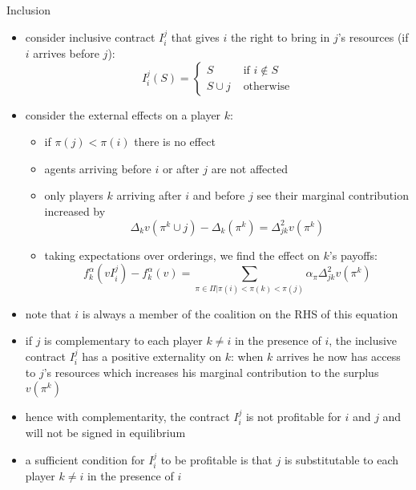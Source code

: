\documentclass[11pt,english]{beamer}
\begin{document}
\begin{frame}[allowframebreaks]{Inclusion}
  \begin{itemize}
  \item consider inclusive contract $I_i^j$ that gives $i$ the right
    to bring in $j$'s resources (if $i$ arrives before $j$):
    \begin{equation*}
      I_i^j(S) =
      \begin{cases}
        S &\text{ if } i \notin S \\
        S \cup j &\text{ otherwise}
      \end{cases}
    \end{equation*}
  \item consider the external effects on a player $k$:
    \begin{itemize}
    \item if $\pi(j)<\pi(i)$ there is no effect
    \item agents arriving before $i$ or after $j$ are not affected
    \item only players $k$ arriving after $i$ and before $j$ see their
      marginal contribution increased by
      \begin{equation*}
        \Delta_k v(\pi^k \cup j)-\Delta_k(\pi^k) = \Delta^2_{jk} v(\pi^k)
      \end{equation*}
    \item taking expectations over orderings, we find the effect on
      $k$'s payoffs:
      \begin{equation*}
        f_k^\alpha(vI_i^j)-f_k^\alpha(v) = \sum_{\pi \in
          \Pi|\pi(i)<\pi(k)<\pi(j)} \alpha_\pi \Delta^2_{jk} v(\pi^k)
      \end{equation*}
    \end{itemize}
  \item note that $i$ is always a member of the coalition on the RHS
    of this equation
  \item if $j$ is complementary to each player $k \neq i$ in the
    presence of $i$, the inclusive contract $I_i^j$ has a positive
    externality on $k$: when $k$ arrives he now has access to $j$'s
    resources which increases his marginal contribution to the surplus
    $v(\pi^k)$
  \item hence with complementarity, the contract $I_i^j$ is not
    profitable for $i$ and $j$ and will not be signed in equilibrium
  \item a sufficient condition for $I_i^j$ to be profitable is that
    $j$ is substitutable to each player $k \neq i$ in the presence of $i$
  \end{itemize}
\end{frame}
\end{document}
